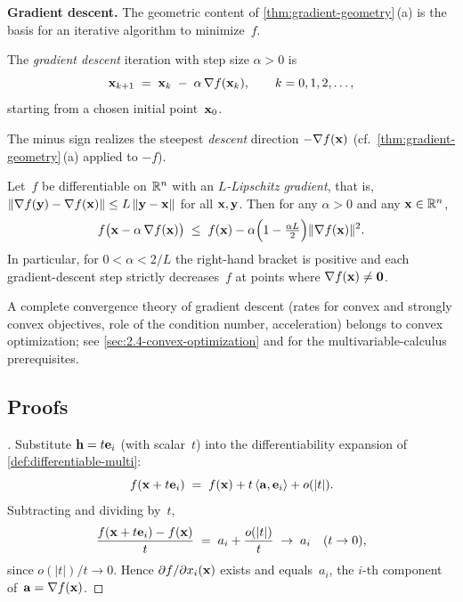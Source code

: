 \medskip

\noindent\textbf{Gradient descent.} The geometric content of
\cref{thm:gradient-geometry}\,(a) is the basis for an iterative
algorithm to minimize~$f$.

\begin{definition}
\label{def:gradient-descent}
The \emph{gradient descent} iteration with step size $\alpha > 0$ is
\[
  \mathbf{x}_{k+1} \;=\; \mathbf{x}_k \;-\; \alpha\, \nabla f(\mathbf{x}_k),
  \qquad k = 0, 1, 2, \dots,
\]
starting from a chosen initial point~$\mathbf{x}_0$.
\end{definition}

The minus sign realizes the steepest \emph{descent} direction
$-\nabla f(\mathbf{x})$ (cf.\ \cref{thm:gradient-geometry}\,(a)
applied to $-f$).

\begin{theorem}
\label{thm:gd-descent}
Let~$f$ be differentiable on $\mathbb{R}^n$ with an \emph{$L$-Lipschitz
gradient}, that is,
$\|\nabla f(\mathbf{y}) - \nabla f(\mathbf{x})\| \le L\,\|\mathbf{y} - \mathbf{x}\|$
for all $\mathbf{x}, \mathbf{y}$. Then for any $\alpha > 0$ and any
$\mathbf{x} \in \mathbb{R}^n$,
\[
  f\bigl(\mathbf{x} - \alpha\, \nabla f(\mathbf{x})\bigr)
  \;\le\; f(\mathbf{x}) - \alpha\Bigl(1 - \tfrac{\alpha L}{2}\Bigr) \|\nabla f(\mathbf{x})\|^2.
\]
In particular, for $0 < \alpha < 2/L$ the right-hand bracket is
positive and each gradient-descent step strictly decreases~$f$ at
points where $\nabla f(\mathbf{x}) \neq \mathbf{0}$.
\end{theorem}

\begin{remark}
A complete convergence theory of gradient descent (rates for convex
and strongly convex objectives, role of the condition number,
acceleration) belongs to convex optimization; see
\cref{sec:2.4-convex-optimization} and \cite{Zorich1981} for the
multivariable-calculus prerequisites.
\end{remark}

\subsection*{Proofs}

\begin{proof}[]
Substitute $\mathbf{h} = t \mathbf{e}_i$ (with scalar~$t$) into the
differentiability expansion of \cref{def:differentiable-multi}:
\[
  f(\mathbf{x} + t\mathbf{e}_i) \;=\; f(\mathbf{x}) + t\, \langle \mathbf{a}, \mathbf{e}_i \rangle + o(|t|).
\]
Subtracting and dividing by~$t$,
\[
  \frac{f(\mathbf{x} + t\mathbf{e}_i) - f(\mathbf{x})}{t} \;=\; a_i + \frac{o(|t|)}{t} \;\to\; a_i \quad (t \to 0),
\]
since $o(|t|)/t \to 0$. Hence $\partial f / \partial x_i (\mathbf{x})$
exists and equals~$a_i$, the $i$-th component of~$\mathbf{a} = \nabla f(\mathbf{x})$.
\end{proof}

